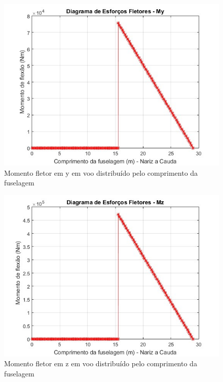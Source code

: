 \begin{figure}
\centering
\includegraphics[width=\textwidth]{cargas/imagens/flet_FUSV.jpg}
\caption{Momento fletor em y em voo distribuído pelo comprimento da fuselagem}
\label{fig:flet_FUSV}
\end{figure}

\begin{figure}
\centering
\includegraphics[width=\textwidth]{cargas/imagens/flet_FUSV2.jpg}
\caption{Momento fletor em z em voo distribuído pelo comprimento da fuselagem}
\label{fig:flet_FUSV2}
\end{figure}

